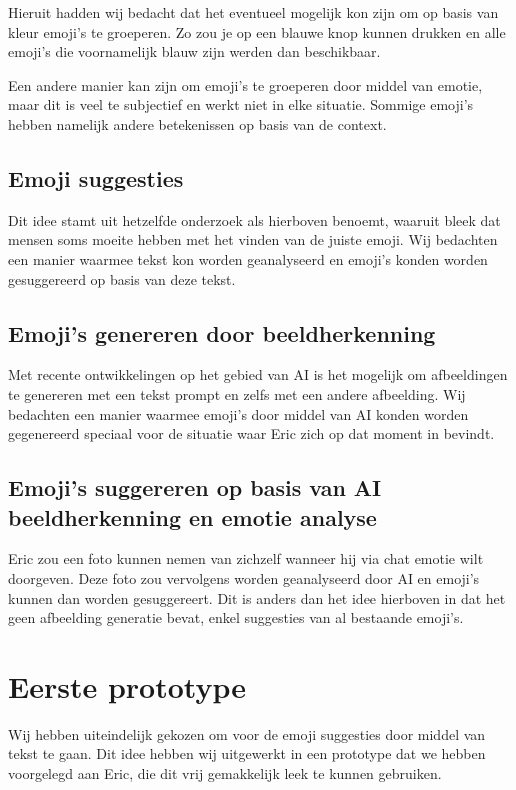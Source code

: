 \documentclass[12pt]{article}
\begin{document}
Hieruit hadden wij bedacht dat het eventueel mogelijk kon zijn om op basis van kleur emoji's te groeperen.
Zo zou je op een blauwe knop kunnen drukken en alle emoji's die voornamelijk blauw zijn werden dan beschikbaar.

Een andere manier kan zijn om emoji's te groeperen door middel van emotie, maar dit is veel te subjectief en werkt niet in elke situatie.
Sommige emoji's hebben namelijk andere betekenissen op basis van de context.

\subsection{Emoji suggesties}

Dit idee stamt uit hetzelfde onderzoek als hierboven benoemt, waaruit bleek dat mensen soms moeite hebben met het vinden van de juiste emoji.
Wij bedachten een manier waarmee tekst kon worden geanalyseerd en emoji's konden worden gesuggereerd op basis van deze tekst.

\subsection{Emoji's genereren door beeldherkenning}

Met recente ontwikkelingen op het gebied van AI is het mogelijk om afbeeldingen te genereren met een tekst prompt en zelfs met een andere afbeelding.
Wij bedachten een manier waarmee emoji's door middel van AI konden worden gegenereerd speciaal voor de situatie waar Eric zich op dat moment in bevindt.

\subsection{Emoji's suggereren op basis van AI beeldherkenning en emotie analyse}

Eric zou een foto kunnen nemen van zichzelf wanneer hij via chat emotie wilt doorgeven.
Deze foto zou vervolgens worden geanalyseerd door AI en emoji's kunnen dan worden gesuggereert.
Dit is anders dan het idee hierboven in dat het geen afbeelding generatie bevat, enkel suggesties van al bestaande emoji's.


\clearpage\section{Eerste prototype}

Wij hebben uiteindelijk gekozen om voor de emoji suggesties door middel van tekst te gaan.
Dit idee hebben wij uitgewerkt in een prototype dat we hebben voorgelegd aan Eric, die dit vrij gemakkelijk leek te kunnen gebruiken.
\end{document}
